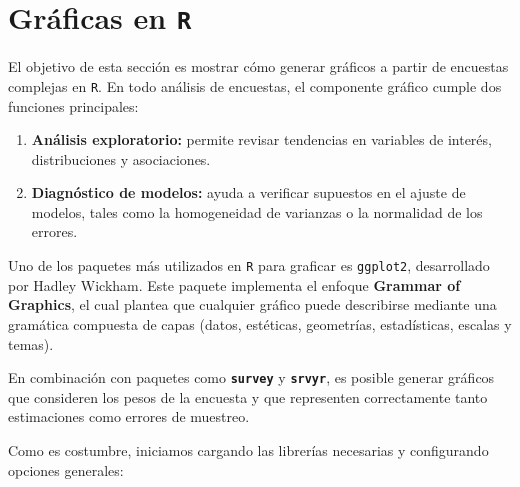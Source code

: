\documentclass[
  spanish,
  12pt,
]{book}
\newenvironment{Shaded}{\begin{snugshade}}{\end{snugshade}}
\newcommand{\AttributeTok}[1]{\textcolor[rgb]{0.13,0.29,0.53}{#1}}
\newcommand{\CommentTok}[1]{\textcolor[rgb]{0.56,0.35,0.01}{\textit{#1}}}
\newcommand{\DecValTok}[1]{\textcolor[rgb]{0.00,0.00,0.81}{#1}}
\newcommand{\FunctionTok}[1]{\textcolor[rgb]{0.13,0.29,0.53}{\textbf{#1}}}
\newcommand{\NormalTok}[1]{#1}
\providecommand{\tightlist}{%
  \setlength{\itemsep}{0pt}\setlength{\parskip}{0pt}}
\begin{document}
\section{\texorpdfstring{Gráficas en \texttt{R}}{Gráficas en R}}\label{gruxe1ficas-en-r}

El objetivo de esta sección es mostrar cómo generar gráficos a partir de encuestas complejas en \texttt{R}. En todo análisis de encuestas, el componente gráfico cumple dos funciones principales:

\begin{enumerate}
\def\labelenumi{\arabic{enumi}.}
\tightlist
\item
  \textbf{Análisis exploratorio:} permite revisar tendencias en variables de interés, distribuciones y asociaciones.
\item
  \textbf{Diagnóstico de modelos:} ayuda a verificar supuestos en el ajuste de modelos, tales como la homogeneidad de varianzas o la normalidad de los errores.
\end{enumerate}

Uno de los paquetes más utilizados en \texttt{R} para graficar es \texttt{ggplot2}, desarrollado por Hadley Wickham. Este paquete implementa el enfoque \textbf{Grammar of Graphics}, el cual plantea que cualquier gráfico puede describirse mediante una gramática compuesta de capas (datos, estéticas, geometrías, estadísticas, escalas y temas).

En combinación con paquetes como \textbf{\texttt{survey}} y \textbf{\texttt{srvyr}}, es posible generar gráficos que consideren los pesos de la encuesta y que representen correctamente tanto estimaciones como errores de muestreo.

Como es costumbre, iniciamos cargando las librerías necesarias y configurando opciones generales:

\begin{Shaded}
\end{Shaded}
\end{document}
